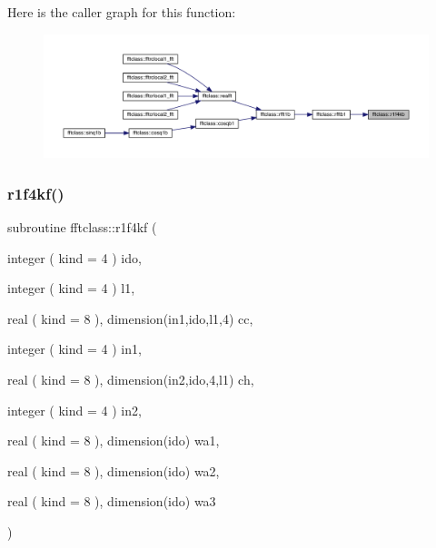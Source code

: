Here is the caller graph for this function\+:\nopagebreak
\begin{figure}[H]
\begin{center}
\leavevmode
\includegraphics[width=350pt]{namespacefftclass_a71f9b9a5e0173f9ddef4dd0fc92e6164_icgraph}
\end{center}
\end{figure}
\mbox{\label{namespacefftclass_ac2e28efef69b7ac5c599c51dc9be973d}} 
\subsubsection{\texorpdfstring{r1f4kf()}{r1f4kf()}}
{\footnotesize\ttfamily subroutine fftclass\+::r1f4kf (\begin{DoxyParamCaption}\item[{integer ( kind = 4 )}]{ido,  }\item[{integer ( kind = 4 )}]{l1,  }\item[{real ( kind = 8 ), dimension(in1,ido,l1,4)}]{cc,  }\item[{integer ( kind = 4 )}]{in1,  }\item[{real ( kind = 8 ), dimension(in2,ido,4,l1)}]{ch,  }\item[{integer ( kind = 4 )}]{in2,  }\item[{real ( kind = 8 ), dimension(ido)}]{wa1,  }\item[{real ( kind = 8 ), dimension(ido)}]{wa2,  }\item[{real ( kind = 8 ), dimension(ido)}]{wa3 }\end{DoxyParamCaption})}

